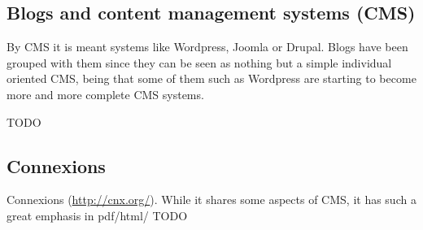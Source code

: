 \documentclass[12pt]{article}
\begin{document}
\subsection{Blogs and content management systems (CMS)}

By CMS it is meant systems like Wordpress, Joomla or Drupal. Blogs have been grouped with them since they can be seen as nothing but a simple individual oriented CMS, being that some of them such as Wordpress are starting to become more and more complete CMS systems.

TODO

\subsection{Connexions}

Connexions (\href{http://cnx.org/}{http://cnx.org/}). While it shares some aspects of CMS, it has such a great emphasis in pdf/html/ TODO
\end{document}
